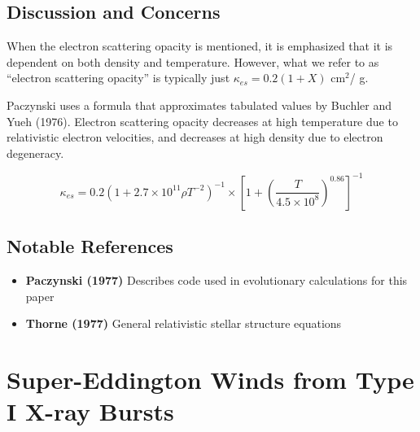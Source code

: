 \documentclass[onecolumn]{aastex63}
\begin{document}
\subsection{Discussion and Concerns}
When the electron scattering opacity is mentioned, it is emphasized that it is dependent on both density and temperature. However, what we refer to as ``electron scattering opacity'' is typically just $\kappa_{es} = 0.2(1 + X)$ cm$^2$/ g.

Paczynski uses a formula that approximates tabulated values by Buchler and Yueh (1976). Electron scattering opacity decreases at high temperature due to relativistic electron velocities, and decreases at high density due to electron degeneracy. 

\begin{equation}
    \kappa_{es} = 0.2\left(1 + 2.7 \times 10^{11}\rho T^{-2}\right)^{-1} \times \left[1 + \left(\frac{T}{4.5\times10^8}\right)^{0.86}\right]^{-1}
\end{equation}


\subsection{Notable References}
\begin{itemize}
    \item \textbf{Paczynski (1977)} Describes code used in evolutionary calculations for this paper
    \item \textbf{Thorne (1977)} General relativistic stellar structure equations
\end{itemize}


\section{Super-Eddington Winds from Type I X-ray Bursts}
\begin{centering}

\cite{yu2018}

\end{centering}
\end{document}
